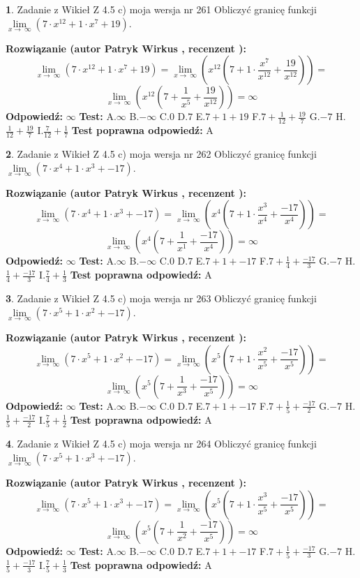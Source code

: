 \documentclass[12pt, a4paper]{article}
\theoremstyle{definition} %
\newtheorem{zad}{}
\newcommand{\zadStart}[1]{\begin{zad}#1\newline}
\newcommand{\zadStop}{\end{zad}}
\newcommand{\rozwStart}[2]{\noindent \textbf{Rozwiązanie (autor #1 , recenzent #2): }\newline}
\newcommand{\rozwStop}{\newline}
\newcommand{\odpStart}{\noindent \textbf{Odpowiedź:}\newline}
\newcommand{\odpStop}{\newline}
\newcommand{\testStart}{\noindent \textbf{Test:}\newline}
\newcommand{\testStop}{\newline}
\newcommand{\kluczStart}{\noindent \textbf{Test poprawna odpowiedź:}\newline}
\newcommand{\kluczStop}{\newline}
\begin{document}
\zadStart{Zadanie z Wikieł Z 4.5 c) moja wersja nr 261}
Obliczyć granicę funkcji  $\lim\limits_{x\to\ \infty}(7 \cdot x^{12}+1 \cdot x^{7}+19)$.
\zadStop
\rozwStart{Patryk Wirkus}{}
$$\lim\limits_{x\to\ \infty}(7 \cdot x^{12}+1 \cdot x^{7}+19) = \lim\limits_{x\to\ \infty}(x^{12}(7 +1 \cdot \frac{x^{7}}{x^{12}}+\frac{19}{x^{12}})) =$$ $$\lim\limits_{x\to\ \infty}(x^{12}(7 +\frac{1}{x^{5}}+\frac{19}{x^{12}})) =\infty$$
\rozwStop
\odpStart
$\infty$
\odpStop
\testStart
A.$\infty$ B.$-\infty$ C.$0$ D.$7$ E.$7 + 1 + 19$
F.$7+\frac{1}{12}+\frac{19}{7}$ G.$-7$
H.$\frac{1}{12}+\frac{19}{7}$
I.$\frac{7}{12}+\frac{1}{7}$
\testStop
\kluczStart
A
\kluczStop



\zadStart{Zadanie z Wikieł Z 4.5 c) moja wersja nr 262}
Obliczyć granicę funkcji  $\lim\limits_{x\to\ \infty}(7 \cdot x^{4}+1 \cdot x^{3}+-17)$.
\zadStop
\rozwStart{Patryk Wirkus}{}
$$\lim\limits_{x\to\ \infty}(7 \cdot x^{4}+1 \cdot x^{3}+-17) = \lim\limits_{x\to\ \infty}(x^{4}(7 +1 \cdot \frac{x^{3}}{x^{4}}+\frac{-17}{x^{4}})) =$$ $$\lim\limits_{x\to\ \infty}(x^{4}(7 +\frac{1}{x^{1}}+\frac{-17}{x^{4}})) =\infty$$
\rozwStop
\odpStart
$\infty$
\odpStop
\testStart
A.$\infty$ B.$-\infty$ C.$0$ D.$7$ E.$7 + 1 + -17$
F.$7+\frac{1}{4}+\frac{-17}{3}$ G.$-7$
H.$\frac{1}{4}+\frac{-17}{3}$
I.$\frac{7}{4}+\frac{1}{3}$
\testStop
\kluczStart
A
\kluczStop



\zadStart{Zadanie z Wikieł Z 4.5 c) moja wersja nr 263}
Obliczyć granicę funkcji  $\lim\limits_{x\to\ \infty}(7 \cdot x^{5}+1 \cdot x^{2}+-17)$.
\zadStop
\rozwStart{Patryk Wirkus}{}
$$\lim\limits_{x\to\ \infty}(7 \cdot x^{5}+1 \cdot x^{2}+-17) = \lim\limits_{x\to\ \infty}(x^{5}(7 +1 \cdot \frac{x^{2}}{x^{5}}+\frac{-17}{x^{5}})) =$$ $$\lim\limits_{x\to\ \infty}(x^{5}(7 +\frac{1}{x^{3}}+\frac{-17}{x^{5}})) =\infty$$
\rozwStop
\odpStart
$\infty$
\odpStop
\testStart
A.$\infty$ B.$-\infty$ C.$0$ D.$7$ E.$7 + 1 + -17$
F.$7+\frac{1}{5}+\frac{-17}{2}$ G.$-7$
H.$\frac{1}{5}+\frac{-17}{2}$
I.$\frac{7}{5}+\frac{1}{2}$
\testStop
\kluczStart
A
\kluczStop



\zadStart{Zadanie z Wikieł Z 4.5 c) moja wersja nr 264}
Obliczyć granicę funkcji  $\lim\limits_{x\to\ \infty}(7 \cdot x^{5}+1 \cdot x^{3}+-17)$.
\zadStop
\rozwStart{Patryk Wirkus}{}
$$\lim\limits_{x\to\ \infty}(7 \cdot x^{5}+1 \cdot x^{3}+-17) = \lim\limits_{x\to\ \infty}(x^{5}(7 +1 \cdot \frac{x^{3}}{x^{5}}+\frac{-17}{x^{5}})) =$$ $$\lim\limits_{x\to\ \infty}(x^{5}(7 +\frac{1}{x^{2}}+\frac{-17}{x^{5}})) =\infty$$
\rozwStop
\odpStart
$\infty$
\odpStop
\testStart
A.$\infty$ B.$-\infty$ C.$0$ D.$7$ E.$7 + 1 + -17$
F.$7+\frac{1}{5}+\frac{-17}{3}$ G.$-7$
H.$\frac{1}{5}+\frac{-17}{3}$
I.$\frac{7}{5}+\frac{1}{3}$
\testStop
\kluczStart
A
\kluczStop
\end{document}
